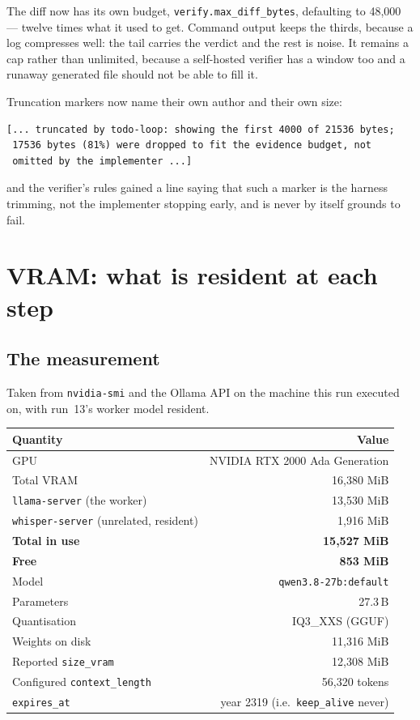 \documentclass[11pt,a4paper]{article}
\newcommand{\key}[1]{\texttt{#1}}
\begin{document}
The diff now has its own budget, \key{verify.max\_diff\_bytes}, defaulting to
48{,}000 --- twelve times what it used to get. Command output keeps the thirds,
because a log compresses well: the tail carries the verdict and the rest is
noise. It remains a cap rather than unlimited, because a self-hosted verifier
has a window too and a runaway generated file should not be able to fill it.

Truncation markers now name their own author and their own size:

\begin{lstlisting}
[... truncated by todo-loop: showing the first 4000 of 21536 bytes;
 17536 bytes (81%) were dropped to fit the evidence budget, not
 omitted by the implementer ...]
\end{lstlisting}

and the verifier's rules gained a line saying that such a marker is the harness
trimming, not the implementer stopping early, and is never by itself grounds to
fail.

\section{VRAM: what is resident at each step}
\label{sec:vram}

\subsection{The measurement}

Taken from \texttt{nvidia-smi} and the Ollama API on the machine this run
executed on, with run~13's worker model resident.

\begin{longtable}{@{}lr@{}}
\toprule
\textbf{Quantity} & \textbf{Value} \\
\midrule
\endhead
GPU & NVIDIA RTX 2000 Ada Generation \\
Total VRAM & 16{,}380 MiB \\
\midrule
\texttt{llama-server} (the worker) & 13{,}530 MiB \\
\texttt{whisper-server} (unrelated, resident) & 1{,}916 MiB \\
\textbf{Total in use} & \textbf{15{,}527 MiB} \\
\textbf{Free} & \textbf{853 MiB} \\
\midrule
Model & \texttt{qwen3.8-27b:default} \\
Parameters & 27.3\,B \\
Quantisation & IQ3\_XXS (GGUF) \\
Weights on disk & 11{,}316 MiB \\
Reported \texttt{size\_vram} & 12{,}308 MiB \\
Configured \texttt{context\_length} & 56{,}320 tokens \\
\texttt{expires\_at} & year 2319 (i.e.\ \texttt{keep\_alive} never) \\
\bottomrule
\end{longtable}
\end{document}
